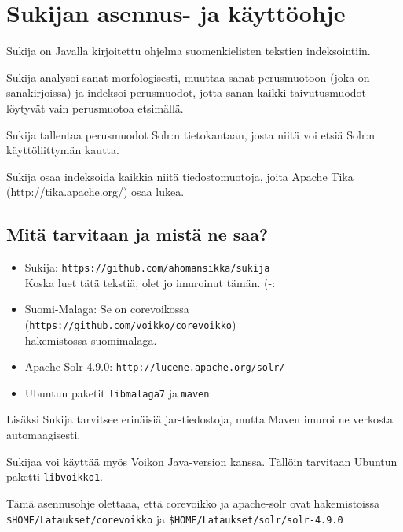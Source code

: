 \documentclass[12pt,a4paper]{scrartcl}
\begin{document}
\pagestyle{fancy}
\setlength{\parindent}{0pt}
\setlength{\parskip}{1ex plus 0.5ex minus 0.2ex}
\section*{Sukijan asennus- ja käyttöohje}

Sukija on Javalla kirjoitettu ohjelma suomenkielisten tekstien
indeksointiin.

Sukija analysoi sanat morfologisesti, muuttaa sanat perusmuotoon (joka
on sanakirjoissa) ja indeksoi perusmuodot, jotta sanan kaikki
taivutusmuodot löytyvät vain perusmuotoa etsimällä.

Sukija tallentaa perusmuodot Solr:n tietokantaan, josta niitä voi
etsiä Solr:n käyttöliittymän kautta.

Sukija osaa indeksoida kaikkia niitä tiedostomuotoja, joita Apache
Tika \\(http://tika.apache.org/) osaa lukea.

\subsection*{Mitä tarvitaan ja mistä ne saa?}

\begin{itemize}

\item Sukija:
      \verb=https://github.com/ahomansikka/sukija= \\
      Koska luet tätä tekstiä, olet jo imuroinut tämän. (-:

\item Suomi-Malaga: Se on corevoikossa
      (\verb=https://github.com/voikko/corevoikko=) \\
      hakemistossa suomimalaga.

\item Apache Solr 4.9.0:
      \verb=http://lucene.apache.org/solr/=

\item Ubuntun paketit \verb=libmalaga7= ja \verb=maven=.
\end{itemize}

Lisäksi Sukija tarvitsee erinäisiä jar-tiedostoja, mutta Maven imuroi
ne verkosta automaagisesti.

Sukijaa voi käyttää myös Voikon Java-version kanssa. Tällöin tarvitaan
Ubuntun paketti  \verb=libvoikko1=.

Tämä asennusohje olettaaa, että corevoikko ja apache-solr ovat hakemistoissa \\
\verb=$HOME/Lataukset/corevoikko= ja
\verb=$HOME/Lataukset/solr/solr-4.9.0=
\end{document}
